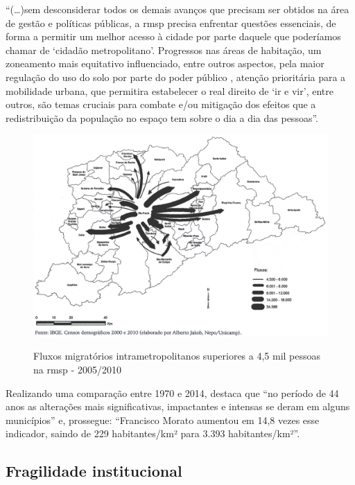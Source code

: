 	\begin{citacao}
		``(\dots )sem desconsiderar todos os demais avanços que precisam ser obtidos na área de gestão e políticas públicas, a \gls{rmsp} precisa enfrentar questões essenciais, de forma a permitir um melhor acesso à cidade por parte daquele que poderíamos chamar de `cidadão metropolitano'. Progressos nas áreas de habitação, um zoneamento mais equitativo \textendash influenciado, entre outros aspectos, pela maior regulação do uso do solo por parte do poder público \textendash, atenção prioritária para a mobilidade urbana, que permitira estabelecer o real direito de `ir e vir', entre outros, são temas cruciais para combate e/ou mitigação dos efeitos que a redistribuição da população no espaço tem sobre o dia a dia das pessoas''.
	\end{citacao}
	
	\begin{figure}[h]
		\centering
		\caption{Fluxos migratórios intrametropolitanos superiores a 4,5 mil pessoas na \gls{rmsp} - 2005/2010}
		\includegraphics[width=\linewidth,keepaspectratio]{img/marques2015_pag134}
		\label{marques2015_pag134}
	\end{figure}
	
	Realizando uma comparação entre 1970 e 2014,  destaca que ``no período de 44 anos as alterações mais significativas, impactantes e intensas se deram em alguns municípios'' e, prossegue: ``Francisco Morato aumentou em 14,8 vezes esse indicador, saindo de 229 habitantes/km² para 3.393 habitantes/km²''.
	
	\subsection{Fragilidade institucional}
	
